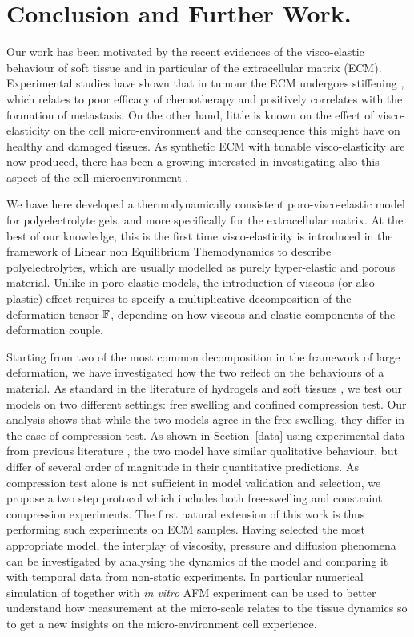\section{Conclusion and Further Work.}

Our work has been motivated by the recent evidences of the visco-elastic behaviour of soft tissue and in particular of the extracellular matrix (ECM). Experimental studies have shown that in tumour the ECM undergoes stiffening \cite{ecm2}, which relates to poor efficacy of chemotherapy and positively correlates with the formation of metastasis. On the other hand, little is known on the effect of visco-elasticity on the cell micro-environment and the consequence this might have on healthy and damaged tissues. As synthetic ECM with tunable visco-elasticity are now produced, there has been a growing interested in investigating also this aspect of the cell microenvironment \cite{viscocell}.

We have here developed a thermodynamically consistent poro-visco-elastic model for polyelectrolyte gels, and more specifically for the extracellular matrix. At the best of our knowledge, this is the first time visco-elasticity is introduced in the framework of Linear non Equilibrium Themodynamics to describe polyelectrolytes, which are usually modelled as purely hyper-elastic and porous material. Unlike in poro-elastic models, the introduction of viscous (or also plastic) effect requires to specify a multiplicative decomposition of the deformation tensor $\mathbb{F}$, depending on how viscous and elastic components of the deformation couple. 

Starting from two of the most common decomposition in the framework of large deformation, we have investigated how the two reflect on the behaviours of a material. As standard in the literature of hydrogels and soft tissues \cite{Article1,DROZDOVph,ecm2}, we test our models on two different settings: free swelling and confined compression test. Our analysis shows that while the two models agree in the free-swelling, they differ in the case of compression test. As shown in Section~\ref{data} using experimental data from previous literature \cite{Netti}, the two model have similar qualitative behaviour, but differ of several order of magnitude in their quantitative predictions. As compression test alone is not sufficient in model validation and selection, we propose a two step protocol which includes both free-swelling and constraint compression experiments. The first natural extension of this work is thus performing such experiments on ECM samples. Having selected the most appropriate model, the interplay of viscosity, pressure and diffusion phenomena can be investigated by analysing the dynamics of the model and comparing it with temporal data from non-static experiments. In particular numerical simulation of  together with \textit{in vitro} AFM experiment can be used to better understand how measurement at the micro-scale relates to the tissue dynamics so to get a new insights on the micro-environment cell experience. 